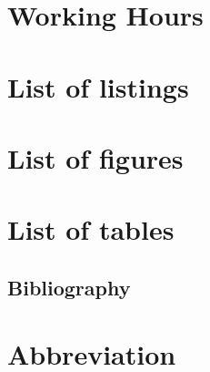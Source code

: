 \singlespacing    %

%    

\section{Working Hours}
    
\pagebreak

\section{List of listings}
{\def\section*#1{}}
\pagebreak

\section{List of figures}
{\def\section*#1{}\listoffigures}
\pagebreak

\section{List of tables}
    {\def\section*#1{}\listoftables}
\pagebreak

\begin{flushleft}
        \section{Bibliography}
    \renewcommand{\headrulewidth}{0.4pt}
    {\def\section*#1{}\printbibliography}
\end{flushleft}
\newpage

\section{Abbreviation}
